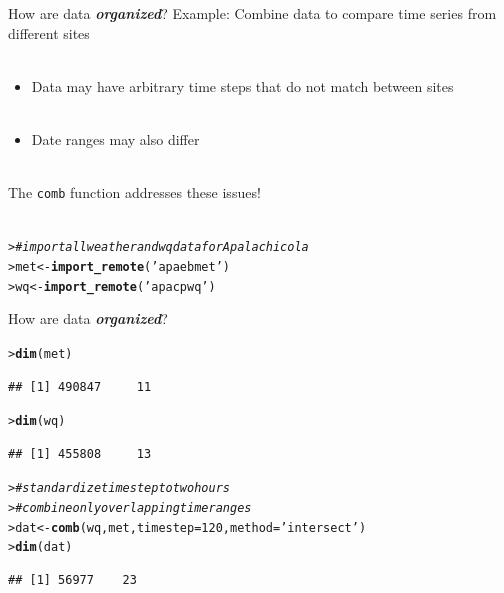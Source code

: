 \documentclass[serif]{beamer}\usepackage[]{graphicx}\usepackage[]{color}
\makeatletter
\newcommand{\hlnum}[1]{\textcolor[rgb]{0.686,0.059,0.569}{#1}}%
\newcommand{\hlstr}[1]{\textcolor[rgb]{0.192,0.494,0.8}{#1}}%
\newcommand{\hlcom}[1]{\textcolor[rgb]{0.678,0.584,0.686}{\textit{#1}}}%
\newcommand{\hlstd}[1]{\textcolor[rgb]{0.345,0.345,0.345}{#1}}%
\newcommand{\hlkwb}[1]{\textcolor[rgb]{0.69,0.353,0.396}{#1}}%
\newcommand{\hlkwc}[1]{\textcolor[rgb]{0.333,0.667,0.333}{#1}}%
\newcommand{\hlkwd}[1]{\textcolor[rgb]{0.737,0.353,0.396}{\textbf{#1}}}%
\newenvironment{kframe}{%
 \def\at@end@of@kframe{}%
 \ifinner\ifhmode%
  \def\at@end@of@kframe{\end{minipage}}%
  \begin{minipage}{\columnwidth}%
 \fi\fi%
 \def\FrameCommand##1{\hskip\@totalleftmargin \hskip-\fboxsep
 \colorbox{shadecolor}{##1}\hskip-\fboxsep
     \hskip-\linewidth \hskip-\@totalleftmargin \hskip\columnwidth}%
 \MakeFramed {\advance\hsize-\width
   \@totalleftmargin\z@ \linewidth\hsize
   \@setminipage}}%
 {\par\unskip\endMakeFramed%
 \at@end@of@kframe}
\newenvironment{knitrout}{}{} %
\newcommand{\Bigtxt}[1]{\textbf{\textit{#1}}}
\makeatother
\begin{document}
\begin{frame}[fragile]{How are data \Bigtxt{organized}?}
Example: Combine data to compare time series from different sites\\~\\
\begin{itemize}
\item Data may have arbitrary time steps that do not match between sites \\~\\
\item Date ranges may also differ \\~\\
\end{itemize}
The \texttt{comb} function addresses these issues! \\~\\
\begin{knitrout}
\color{fgcolor}\begin{kframe}
\begin{alltt}
\hlstd{> }\hlcom{# import all weather and wq data for Apalachicola}
\hlstd{> }\hlstd{met} \hlkwb{<-} \hlkwd{import_remote}\hlstd{(}\hlstr{'apaebmet'}\hlstd{)}
\hlstd{> }\hlstd{wq} \hlkwb{<-} \hlkwd{import_remote}\hlstd{(}\hlstr{'apacpwq'}\hlstd{)}
\end{alltt}
\end{kframe}
\end{knitrout}
\end{frame}

\begin{frame}[fragile]{How are data \Bigtxt{organized}?}
\begin{knitrout}\small
{}\color{fgcolor}\begin{kframe}
\begin{alltt}
\hlstd{> }\hlkwd{dim}\hlstd{(met)}
\end{alltt}
\begin{verbatim}
## [1] 490847     11
\end{verbatim}
\begin{alltt}
\hlstd{> }\hlkwd{dim}\hlstd{(wq)}
\end{alltt}
\begin{verbatim}
## [1] 455808     13
\end{verbatim}
\begin{alltt}
\hlstd{> }\hlcom{# standardize time step to two hours}
\hlstd{> }\hlcom{# combine only overlapping time ranges}
\hlstd{> }\hlstd{dat} \hlkwb{<-} \hlkwd{comb}\hlstd{(wq, met,} \hlkwc{timestep} \hlstd{=} \hlnum{120}\hlstd{,} \hlkwc{method} \hlstd{=} \hlstr{'intersect'}\hlstd{)}
\hlstd{> }\hlkwd{dim}\hlstd{(dat)}
\end{alltt}
\begin{verbatim}
## [1] 56977    23
\end{verbatim}
\end{kframe}
\end{knitrout}
\end{frame}
\end{document}
